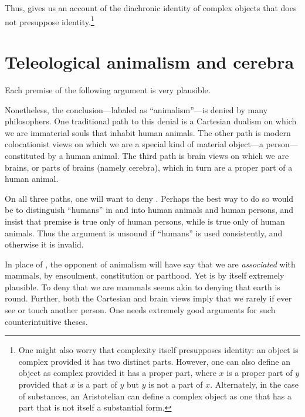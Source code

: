 Thus,  gives us an account of the diachronic identity of complex objects
that does not presuppose identity.\footnote{One might also worry that complexity itself
presupposes identity: an object is complex provided it has two distinct parts. However,
one can also define an object as complex provided it has a proper part, where $x$ is 
a proper part of $y$ provided that $x$ is a part of $y$ but $y$ is not a part of $x$.
Alternately, in the case of substances, an Aristotelian can define a complex object as 
one that has a part that is not itself a substantial form.}

\section{Teleological animalism and cerebra}
Each premise of the following argument is very plausible.

Nonetheless, the conclusion---labaled as ``animalism''---is denied by many philosophers. One traditional path to 
this denial is a Cartesian dualism on which we are immaterial souls that inhabit human animals. The other path 
is modern colocationist views on which we are a special kind of material object---a person---constituted by a human 
animal. The third path is brain views on which we are brains, or parts of brains (namely cerebra), which in turn are a 
proper part of a human animal. 

On all three paths, one will want to deny . Perhaps the best way to do so would be to distinguish ``humans'' 
in  and  into  human animals and human persons, and insist that premise  is true 
only of human persons, while  is true only of human animals. Thus the argument is unsound if ``humans'' is used 
consistently, and otherwise it is invalid. 

In place of , the opponent of animalism will have say that we are 
\textit{associated} with mammals, by ensoulment, constitution or parthood.   Yet  is by itself extremely plausible. 
To deny that we are mammals seems akin to denying that earth
is round. Further, both the Cartesian and brain views imply that we
rarely if ever see or touch another person. One needs extremely good arguments for such counterintuitive theses. 

